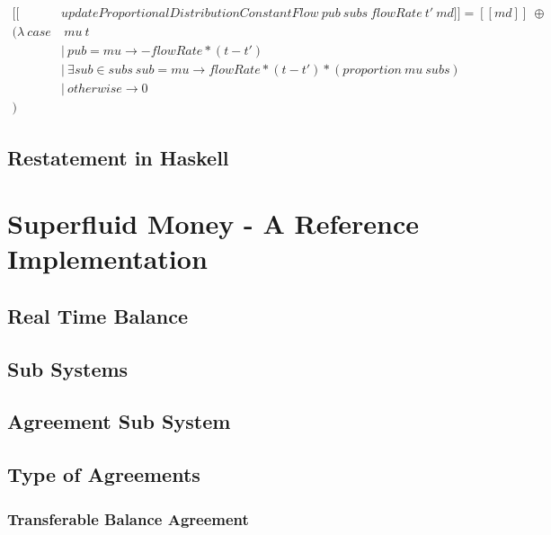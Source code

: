\begin{equation}\label{sem_distributeProportionally}
    \begin{split}
        [\![&updateProportionalDistributionConstantFlow\ pub\ subs\ flowRate\ t'\ md]\!] = [\![md]\!]\ \oplus \\
        (\lambda\ case&\ mu\ t \\
        &|\ pub = mu \rightarrow -flowRate * (t - t') \\
        &|\ \exists sub \in subs\ { sub = mu } \rightarrow flowRate * (t - t') * (proportion\ mu\ subs) \\
        &|\ otherwise \rightarrow 0 \\
        )
    \end{split}
\end{equation}

\section{Restatement in Haskell}

\chapter{Superfluid Money - A Reference Implementation}

\section{Real Time Balance}

\section{Sub Systems}

\section{Agreement Sub System}

\section{Type of Agreements}

\subsection{Transferable Balance Agreement}

